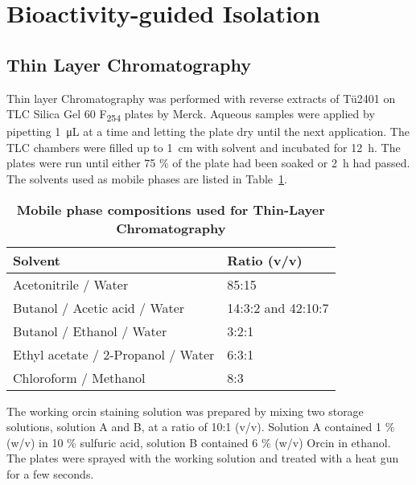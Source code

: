 
\clearpage

\section{Bioactivity-guided Isolation} %
\label{sec:bioactivity_guided_isolation}


	\subsection{Thin Layer Chromatography} %
	\label{sub:thin_layer_chromatography}
	Thin layer Chromatography was performed with reverse extracts of T\"u2401 on TLC Silica Gel 60 F\textsubscript{254} plates by Merck.
	Aqueous samples were applied by pipetting \SI{1}{\micro\liter} at a time and letting the plate dry until the next application. The TLC chambers were filled up to \SI{1}{\centi\meter} with solvent and incubated for \SI{12}{\hour}. The plates were run until either 75 \% of the plate had been soaked or \SI{2}{\hour} had passed. The solvents used as mobile phases are listed in Table~\ref{tab:tlc_solvents}.

	\begin{table}[htbp]
		\caption[Mobile phase compositions used for Thin-Layer Chromatography]{\textbf{Mobile phase compositions used for Thin-Layer Chromatography}}
		\label{tab:tlc_solvents}
		\centering
		\begin{tabularx}{\textwidth}{XX}
			\toprule
			\textbf{Solvent}			& \textbf{Ratio (v/v)}	\\
			\midrule
			Acetonitrile / Water				& 85:15		\\
			Butanol / Acetic acid / Water		& 14:3:2 and 42:10:7	\\
			Butanol / Ethanol / Water			& 3:2:1		\\
			Ethyl acetate / 2-Propanol / Water	& 6:3:1		\\
			Chloroform / Methanol				& 8:3		\\
			\bottomrule
		\end{tabularx}
	\end{table}

	The working orcin staining solution was prepared by mixing two storage solutions, solution A and B, at a ratio of 10:1 (v/v). Solution A contained 1 \% (w/v)  in 10 \% sulfuric acid, solution B contained 6 \% (w/v) Orcin in ethanol. The plates were sprayed with the working solution and treated with a heat gun for a few seconds.

